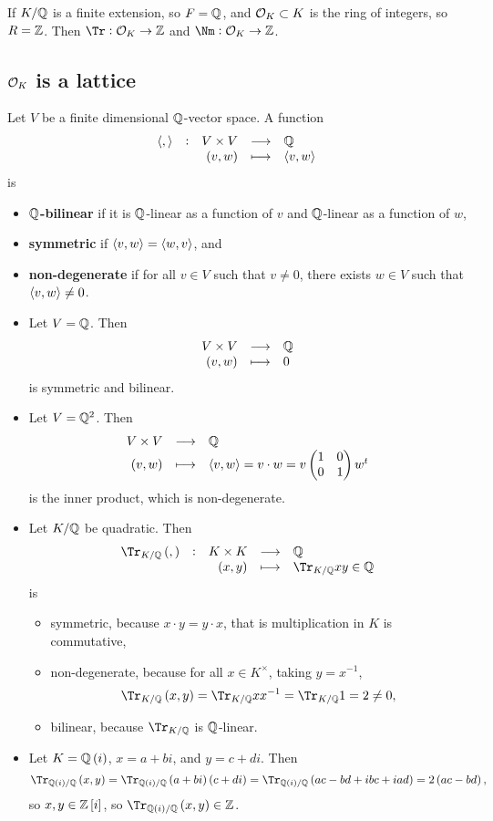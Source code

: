 \begin{corollary}
If $ K / \mathbb{Q} $ is a finite extension, so $ F = \mathbb{Q} $, and $ \mathcal{O}_K \subset K $ is the ring of integers, so $ R = \mathbb{Z} $. Then $ \Tr : \OOO_K \to \ZZ $ and $ \Nm : \OOO_K \to \ZZ $.
\end{corollary}

\subsection{\texorpdfstring{$ \mathcal{O}_K $}{OK} is a lattice}

\begin{definition}
Let $ V $ be a finite dimensional $ \mathbb{Q} $-vector space. A function
$$ \function[\abr{,}]{V \times V}{\QQ}{\br{v, w}}{\abr{v, w}} $$
is
\begin{itemize}
\item \textbf{$ \mathbb{Q} $-bilinear} if it is $ \mathbb{Q} $-linear as a function of $ v $ and $ \mathbb{Q} $-linear as a function of $ w $,
\item \textbf{symmetric} if $ \left\langle v, w \right\rangle = \left\langle w, v \right\rangle $, and
\item \textbf{non-degenerate} if for all $ v \in V $ such that $ v \ne 0 $, there exists $ w \in V $ such that $ \left\langle v, w \right\rangle \ne 0 $.
\end{itemize}
\end{definition}

\begin{example*}
\hfill
\begin{itemize}
\item Let $ V = \mathbb{Q} $. Then
$$ \function{V \times V}{\QQ}{\br{v, w}}{0} $$
is symmetric and bilinear.

\pagebreak

\item Let $ V = \mathbb{Q}^2 $. Then
$$ \function{V \times V}{\QQ}{\br{v, w}}{\abr{v, w} = v \cdot w = v\twobytwo{1}{0}{0}{1}w^t} $$
is the inner product, which is non-degenerate.
\item Let $ K / \mathbb{Q} $ be quadratic. Then
$$ \function[\Tr_{K / \QQ}\br{,}]{K \times K}{\QQ}{\br{x, y}}{\Tr_{K / \QQ} xy \in \QQ} $$
is
\begin{itemize}
\item symmetric, because $ x \cdot y = y \cdot x $, that is multiplication in $ K $ is commutative,
\item non-degenerate, because for all $ x \in K^\times $, taking $ y = x^{-1} $,
$$ \Tr_{K / \QQ}\br{x, y} = \Tr_{K / \QQ} xx^{-1} = \Tr_{K / \QQ} 1 = 2 \ne 0, $$
\item bilinear, because $ \Tr_{K / \QQ} $ is $ \mathbb{Q} $-linear.
\end{itemize}
\item Let $ K = \QQ\br{i} $, $ x = a + bi $, and $ y = c + di $. Then
$$ \Tr_{\QQ\br{i} / \QQ}\br{x, y} = \Tr_{\QQ\br{i} / \QQ} \br{a + bi}\br{c + di} = \Tr_{\QQ\br{i} / \QQ} \br{ac - bd + ibc + iad} = 2\br{ac - bd}, $$
so $ x, y \in \ZZ\sbr{i} $, so $ \Tr_{\QQ\br{i} / \QQ}\br{x, y} \in \ZZ $.
\end{itemize}
\end{example*}

